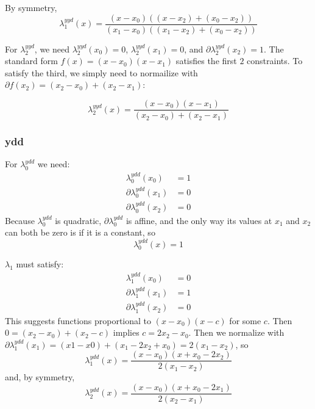 By symmetry, 
\begin{equation}
\lambda^{yyd}_1(x) = 
\frac 
{(x - x_0) \left( (x - x_2) + (x_0 - x_2) \right)} 
{(x_1 - x_0) \left( (x_1 - x_2) + (x_0 - x_2) \right)}
\end{equation}

 For $\lambda^{yyd}_2$, we need 
$\lambda^{yyd}_2(x_0) = 0$, 
$\lambda^{yyd}_2(x_1) = 0$, and
$\partial\lambda^{yyd}_2(x_2) = 1$. 
The standard form $f(x) = (x-x_0) (x-x_1)$ satisfies the first 
$2$ constraints. 
To satisfy the third, we simply need to normailize with
$\partial{f}(x_2) = (x_2 - x_0) + (x_2 - x_1)$:

\begin{equation}
\lambda^{yyd}_2(x) = 
\frac 
{(x - x_0) (x - x_1)} 
{(x_2 - x_0) + (x_2 - x_1)}
\end{equation}

\subsubsection{ydd}

For $\lambda^{ydd}_0$ we need:
\begin{align}
\lambda^{ydd}_0(x_0) & = 1 \\
\partial\lambda^{ydd}_0(x_1) & = 0 \nonumber \\
\partial\lambda^{ydd}_0(x_2) & = 0 \nonumber
\end{align}
Because $\lambda^{ydd}_0$ is quadratic,
$\partial\lambda^{ydd}_0$ is affine, 
and the only way its values
at $x_1$ and $x_2$ can both be zero is if it is a constant, so 
\begin{equation}
\lambda^{ydd}_0(x) = 1
\end{equation}

$\lambda_1$ must satisfy:
\begin{align}
\lambda^{ydd}_1(x_0) & = 0 \\
\partial\lambda^{ydd}_1(x_1) & = 1 \nonumber \\
\partial\lambda^{ydd}_1(x_2) & = 0 \nonumber
\end{align}
This suggests functions proportional to $(x - x_0) (x - c)$ 
for some $c$. Then 
$ 0 = (x_2 - x_0) + (x_2 - c)$
implies $ c = 2 x_2 - x_0$.
Then we normalize with 
$\partial\lambda^{ydd}_1(x_1) = (x1 - x0) + (x_1 - 2 x_2 + x_0) 
= 2 (x_1 - x_2)$, so 
\begin{equation}
\lambda^{ydd}_1(x) = 
\frac {(x - x_0) (x + x_0 - 2 x_2)} {2 (x_1 - x_2)}
\end{equation}
and, by symmetry,
\begin{equation}
\lambda^{ydd}_2(x) = 
\frac {(x - x_0) (x + x_0 - 2 x_1)} {2 (x_2 - x_1)}
\end{equation}


 
 